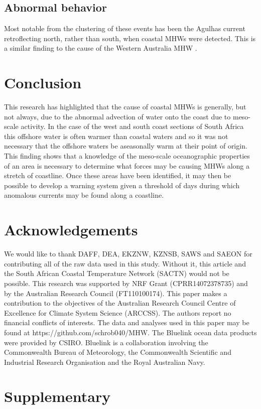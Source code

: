 \documentclass[a4paper,10pt,review]{elsarticle}
\begin{document}
\subsection{Abnormal behavior}
Most notable from the clustering of these events has been the Agulhas current retroflecting north, rather than south, when coastal MHWs were detected. This is a similar finding to the cause of the Western Australia MHW \citep{Feng2013, Benthuysen2014}.

\section{Conclusion}
This research has highlighted that the cause of coastal MHWs is generally, but not always, due to the abnormal advection of water onto the coast due to meso-scale activity. In the case of the west and south coast sections of South Africa this offshore water is often warmer than coastal waters and so it was not necessary that the offshore waters be aseasonally warm at their point of origin. This finding shows that a knowledge of the meso-scale oceanographic properties of an area is necessary to determine what forces may be causing MHWs along a stretch of coastline. Once these areas have been identified, it may then be possible to develop a warning system given a threshold of days during which anomalous currents may be found along a coastline. 

\section*{Acknowledgements}
We would like to thank DAFF, DEA, EKZNW, KZNSB, SAWS and SAEON for contributing all of the raw data used in this study. Without it, this article and the South African Coastal Temperature Network (SACTN) would not be possible. This research was supported by NRF Grant (CPRR14072378735) and by the Australian Research Council (FT110100174). This paper makes a contribution to the objectives of the Australian Research Council Centre of Excellence for Climate System Science (ARCCSS). The authors report no financial conflicts of interests. The data and analyses used in this paper may be found at https://github.com/schrob040/MHW. The Bluelink ocean data products were provided by CSIRO. Bluelink is a collaboration involving the Commonwealth Bureau of Meteorology, the Commonwealth Scientific and Industrial Research Organisation and the Royal Australian Navy.

\section*{Supplementary}
\end{document}
